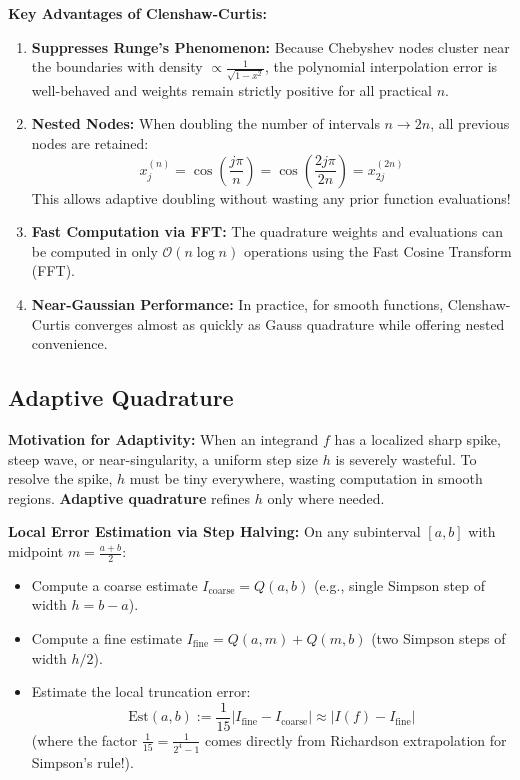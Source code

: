 \begin{remark}
    \textbf{Key Advantages of Clenshaw-Curtis:}
    \begin{enumerate}
        \item \textbf{Suppresses Runge's Phenomenon:} Because Chebyshev nodes cluster near the boundaries with density $\propto \frac{1}{\sqrt{1-x^2}}$, the polynomial interpolation error is well-behaved and weights remain strictly positive for all practical $n$.
        \item \textbf{Nested Nodes:} When doubling the number of intervals $n \to 2n$, all previous nodes are retained:
        $$x_j^{(n)} = \cos\left(\frac{j\pi}{n}\right) = \cos\left(\frac{2j\pi}{2n}\right) = x_{2j}^{(2n)}$$
        This allows adaptive doubling without wasting any prior function evaluations!
        \item \textbf{Fast Computation via FFT:} The quadrature weights and evaluations can be computed in only $\mathcal{O}(n \log n)$ operations using the Fast Cosine Transform (FFT).
        \item \textbf{Near-Gaussian Performance:} In practice, for smooth functions, Clenshaw-Curtis converges almost as quickly as Gauss quadrature while offering nested convenience.
    \end{enumerate}
\end{remark}

\subsection{Adaptive Quadrature}

\begin{remark}
    \textbf{Motivation for Adaptivity:} When an integrand $f$ has a localized sharp spike, steep wave, or near-singularity, a uniform step size $h$ is severely wasteful. To resolve the spike, $h$ must be tiny everywhere, wasting computation in smooth regions. \textbf{Adaptive quadrature} refines $h$ only where needed.
\end{remark}

\begin{definition}
    \textbf{Local Error Estimation via Step Halving:} On any subinterval $[a, b]$ with midpoint $m = \frac{a+b}{2}$:
    \begin{itemize}
        \item Compute a coarse estimate $I_{\text{coarse}} = Q(a, b)$ (e.g., single Simpson step of width $h = b-a$).
        \item Compute a fine estimate $I_{\text{fine}} = Q(a, m) + Q(m, b)$ (two Simpson steps of width $h/2$).
        \item Estimate the local truncation error:
        $$\text{Est}(a, b) := \frac{1}{15} |I_{\text{fine}} - I_{\text{coarse}}| \approx |I(f) - I_{\text{fine}}|$$
        (where the factor $\frac{1}{15} = \frac{1}{2^4 - 1}$ comes directly from Richardson extrapolation for Simpson's rule!).
    \end{itemize}
\end{definition}

